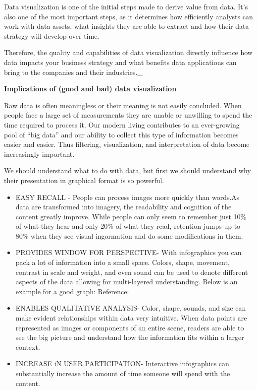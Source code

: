 \documentclass[]{book}
\theoremstyle{definition}
\theoremstyle{definition}
\theoremstyle{definition}
\theoremstyle{remark}
\begin{document}
Data visualization is one of the initial steps made to derive value from
data. It's also one of the most important steps, as it determines how
efficiently analysts can work with data assets, what insights they are
able to extract and how their data strategy will develop over time.

Therefore, the quality and capabilities of data visualization directly
influence how data impacts your business strategy and what benefits data
applications can bring to the companies and their industries.\_

\textbf{Implications of (good and bad) data visualization}

Raw data is often meaningless or their meaning is not easily concluded.
When people face a large set of measurements they are unable or
unwilling to spend the time required to process it. Our modern living
contributes to an ever-growing pool of ``big data'' and our ability to
collect this type of information becomes easier and easier. Thus
filtering, visualization, and interpretation of data become increasingly
important.

We should understand what to do with data, but first we should
understand why their presentation in graphical format is so powerful.

\begin{itemize}
\item
  EASY RECALL - People can process images more quickly than words.As
  data are transformed into imagery, the readability and cognition of
  the content greatly improve. While people can only seem to remember
  just 10\% of what they hear and only 20\% of what they read, retention
  jumps up to 80\% when they see visual ingormation and do some
  modifications in them.
\item
  PROVIDES WINDOW FOR PERSPECTIVE- With infographics you can pack a lot
  of information into a small space. Colors, shape, movement, contrast
  in scale and weight, and even sound can be used to denote different
  aspects of the data allowing for multi-layered understanding. Below is
  an example for a good graph: Reference: \citep{image_good}
\item
  ENABLES QUALITATIVE ANALYSIS- Color, shape, sounds, and size can make
  evident relationships within data very intuitive. When data points are
  represented as images or components of an entire scene, readers are
  able to see the big picture and understand how the information fits
  within a larger context.
\item
  INCREASE iN USER PARTICIPATION- Interactive infographics can
  substantially increase the amount of time someone will spend with the
  content.
\end{itemize}
\end{document}
